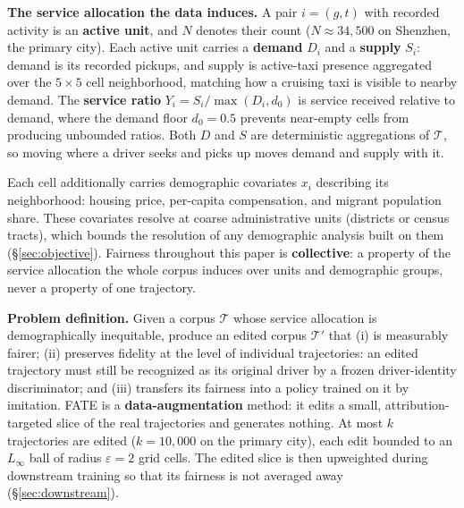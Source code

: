 \textbf{The service allocation the data induces.} A pair $i=(g,t)$ with
recorded activity is an \textbf{active unit}, and $N$ denotes their count
($N \approx 34{,}500$ on Shenzhen, the primary city). Each active unit carries a
\textbf{demand} $D_i$ and a \textbf{supply} $S_i$: demand is its recorded
pickups, and supply is active-taxi presence aggregated over the
$5{\times}5$ cell neighborhood, matching how a cruising taxi is visible to
nearby demand. The \textbf{service ratio}
$Y_i = S_i / \max(D_i, d_0)$ is service received relative to demand, where
the demand floor $d_0 = 0.5$ prevents near-empty cells from producing
unbounded ratios. Both $D$ and $S$
are deterministic aggregations of $\mathcal{T}$, so moving where a driver
seeks and picks up moves demand and supply with it.

Each cell additionally carries demographic covariates $x_i$ describing its
neighborhood: housing price, per-capita compensation, and migrant population
share. These covariates resolve at coarse administrative units (districts or
census tracts), which bounds the
resolution of any demographic analysis built on them (\S\ref{sec:objective}).
Fairness throughout this paper is \textbf{collective}: a property of the
service allocation the whole corpus induces over units and demographic
groups, never a property of one trajectory.

\textbf{Problem definition.} Given a corpus $\mathcal{T}$ whose service
allocation is demographically inequitable, produce an edited corpus
$\mathcal{T}'$ that (i) is measurably fairer; (ii) preserves fidelity at the
level of individual trajectories: an edited trajectory must still be
recognized as its original driver by a frozen driver-identity
discriminator; and (iii) transfers its fairness into a policy trained on it by
imitation. FATE is a \textbf{data-augmentation} method: it edits a small,
attribution-targeted slice of the real trajectories and generates nothing. At
most $k$ trajectories are edited ($k = 10{,}000$ on the primary city), each
edit bounded to an $L_\infty$ ball of radius $\varepsilon = 2$ grid cells.
The edited slice is then upweighted during downstream training so that its
fairness is not averaged away (\S\ref{sec:downstream}).

